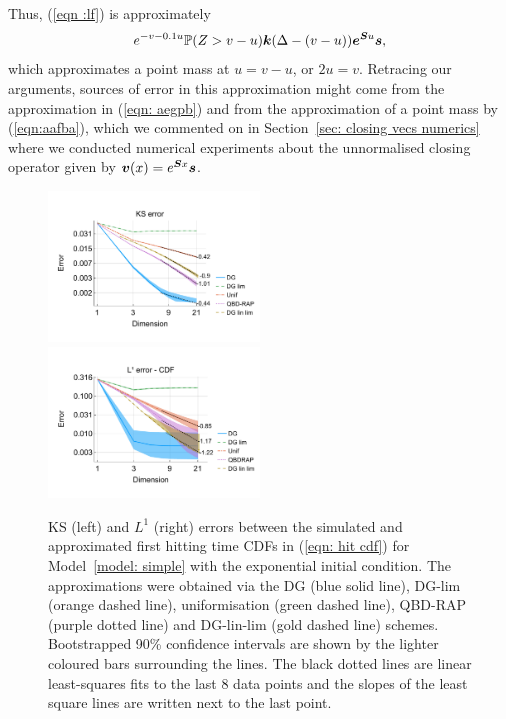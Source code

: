 Thus, (\ref{eqn :lf}) is approximately  
\[e^{-v-0.1u} \mathbb P(Z>v-u) \boldsymbol k(\Delta-(v-u))\boldsymbol e^{\boldsymbol Su}\boldsymbol s,\]
which approximates a point mass at \(u=v-u\), or \(2u=v\). Retracing our arguments, sources of error in this approximation might come from the approximation in (\ref{eqn: aegpb}) and from the approximation of a point mass by (\ref{eqn:aafba}), which we commented on in Section~\ref{sec: closing vecs numerics} where we conducted numerical experiments about the unnormalised closing operator given by \(\boldsymbol v(x) = e^{\boldsymbol S x}\boldsymbol s\). 


\begin{figure}[h]
	\centering
	\includegraphics[width=0.5\textwidth,trim={0.75cm 0.8cm 0.25cm 1.25cm},clip]{chapter6/figs/hitting_times_model/hitting_times/exp/ks_error_formatted.pdf}%
	\includegraphics[width=0.5\textwidth,trim={0.75cm 0.8cm 0.25cm 1.25cm},clip]{chapter6/figs/hitting_times_model/hitting_times/exp/l1_cdf_error_formatted.pdf}
	\caption{KS (left) and \(L^1\) (right) errors between the simulated and approximated first hitting time CDFs in (\ref{eqn: hit cdf}) for Model~\ref{model: simple} with the exponential initial condition. The approximations were obtained via the DG (blue solid line), DG-lim (orange dashed line), uniformisation (green dashed line), QBD-RAP (purple dotted line) and DG-lin-lim (gold dashed line) schemes. Bootstrapped 90\% confidence intervals are shown by the lighter coloured bars surrounding the lines. The black dotted lines are linear least-squares fits to the last 8 data points and the slopes of the least square lines are written next to the last point.}
	\label{fig: hitting time exp} 
\end{figure}
